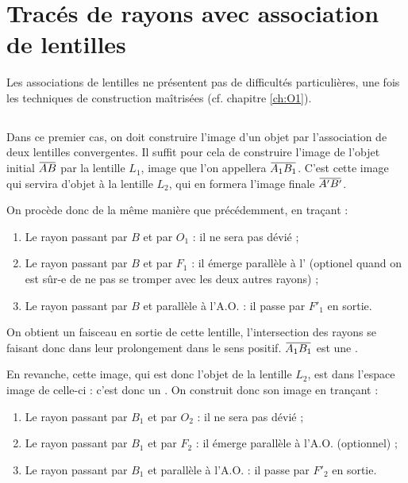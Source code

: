 \documentclass[10pt,a5paper,notitlepage]{book}
\begin{document}
\section{Tracés de rayons avec association de lentilles}
Les associations de lentilles ne présentent pas de difficultés particulières,
une fois les techniques de construction maîtrisées (cf. chapitre \ref{ch:O1}).

\subsection{}
Dans ce premier cas, on doit construire l'image d'un objet  par
l'association de deux lentilles convergentes. Il suffit pour cela de construire
l'image de l'objet initial $\ABb$ par la lentille $L_1$, image que l'on appellera
$\ABa$. C'est cette image qui servira d'objet à la lentille $L_2$, qui en
formera l'image finale $\ABp$. \bigbreak

On procède donc de la même manière que précédemment, en traçant :
\begin{enumerate}
    \item Le rayon passant par $B$ et par $O_1$ : il ne sera pas dévié ;
    \item Le rayon passant par $B$ et par $F_1$ : il émerge parallèle à
        l' (optionel quand on est sûr-e de ne pas se
        tromper avec les deux autres rayons) ;
    \item Le rayon passant par $B$ et parallèle à l'A.O. : il passe par $F'_1$
        en sortie.
\end{enumerate}

On obtient un faisceau  en sortie de cette lentille,
l'intersection des rayons se faisant donc dans leur prolongement dans le sens
positif. $\ABa$ est une  . \bigbreak

En revanche, cette image, qui est donc l'objet de la lentille $L_2$, est dans
l'espace image de celle-ci : c'est donc un  . On construit donc son image en trançant :

\begin{enumerate}
    \item Le rayon passant par $B_1$ et par $O_2$ : il ne sera pas dévié ;
    \item Le rayon passant par $B_1$ et par $F_2$ : il émerge parallèle à l'A.O.
        (optionnel) ;
    \item Le rayon passant par $B_1$ et parallèle à l'A.O. : il passe par $F'_2$
        en sortie.
\end{enumerate}
\end{document}
